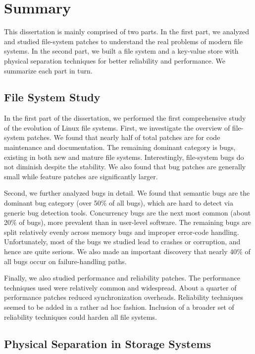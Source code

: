 \section{Summary}
\label{sec-conc-summary}

This dissertation is mainly comprised of two parts. In the first part,
we analyzed and studied file-system patches to understand the real problems 
of modern file systems. In the second part, we built a file system and
a key-value store with physical separation techniques for better
reliability and performance. We summarize each part in turn.


\subsection{File System Study} 
\label{sec-conc-study}

In the first part of the dissertation, we performed the first
comprehensive study of the evolution of Linux file systems.
First, we investigate the overview of file-system patches. We found
that nearly half of total patches are for code maintenance and
documentation. The remaining dominant category is bugs, existing in
both new and mature file systems. Interestingly, file-system bugs do
not diminish despite the stability.  We also found that bug patches
are generally small while feature patches are significantly larger. 

Second, we further analyzed bugs in detail. We found that semantic
bugs are the dominant bug category (over 50\% of all bugs), which are
hard to detect via generic bug detection tools. Concurrency bugs are
the next most common (about 20\% of bugs), more prevalent than in
user-level software. The remaining bugs are split relatively evenly
across memory bugs and improper error-code handling. Unfortunately,
most of the bugs we studied lead to crashes or corruption, and hence
are quite serious. We also made an important discovery that nearly
40\% of all bugs occur on failure-handling paths. 

Finally, we also studied performance and reliability patches. The
performance techniques used were relatively common and
widespread. About a quarter of performance patches reduced
synchronization overheads. Reliability techniques seemed to be added
in a rather ad hoc fashion. Inclusion of a broader set of reliability
techniques could harden all file systems.  

\subsection{Physical Separation in Storage Systems}
\label{sec-conc-icefs}

